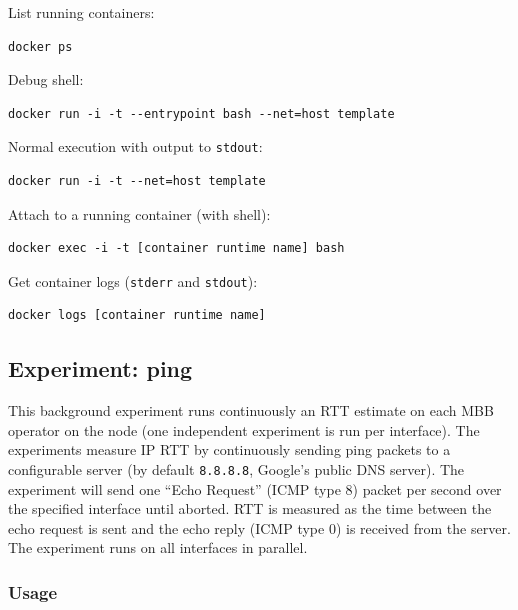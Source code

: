 \documentclass[a4paper,10pt]{article}
\newcommand{\identifier}[1]{{\texttt{\small{#1}}}}
\begin{document}
\begin{itemize*}
	\item List running containers:
	\begin{verbatim}docker ps\end{verbatim}
	
	\item Debug shell:
	\begin{verbatim}docker run -i -t --entrypoint bash --net=host template\end{verbatim}
	
	\item Normal execution with output to \identifier{stdout}:
	\begin{verbatim}docker run -i -t --net=host template\end{verbatim}
	
	\item Attach to a running container (with shell):
	\begin{verbatim}docker exec -i -t [container runtime name] bash\end{verbatim}
	
	\item Get container logs (\identifier{stderr} and \identifier{stdout}):
	\begin{verbatim}docker logs [container runtime name]\end{verbatim}
\end{itemize*}


\subsection{Experiment: ping}

This background experiment runs continuously an RTT estimate on each MBB operator on the node (one independent experiment is run per interface).
The experiments measure IP RTT by continuously sending ping packets to a configurable server (by default \identifier{8.8.8.8}, Google's public DNS server).
The experiment will send one ``Echo Request'' (ICMP type 8) packet per second over the specified interface until aborted.
RTT is measured as the time between the echo request is sent and the echo reply (ICMP type 0) is received from the server.
The experiment runs on all interfaces in parallel.

\subsubsection{Usage}
\end{document}
